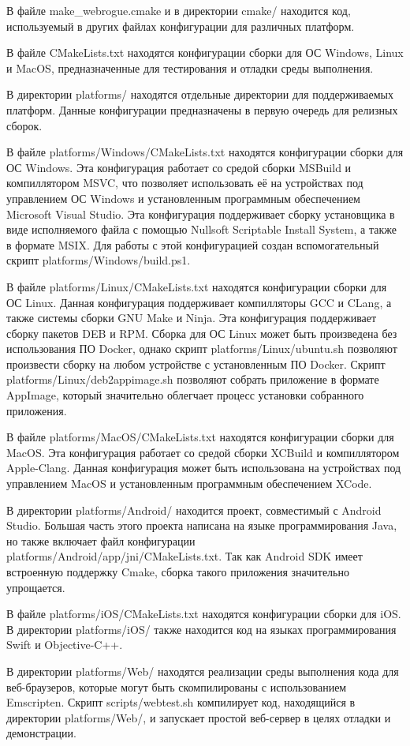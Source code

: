 В файле make\_webrogue.cmake и в директории cmake/ находится код, используемый в других файлах конфигурации для различных платформ.

В файле CMakeLists.txt находятся конфигурации сборки для ОС Windows, Linux и MacOS, предназначенные для тестирования и отладки среды выполнения.

В директории platforms/ находятся отдельные директории для поддерживаемых платформ. Данные конфигурации предназначены в первую очередь для релизных сборок.

В файле platforms/Windows/CMakeLists.txt находятся конфигурации сборки для ОС Windows. 
Эта конфигурация работает со средой сборки MSBuild и компиллятором MSVC, что позволяет использовать её на устройствах под управлением ОС Windows и установленным программным обеспечением Microsoft Visual Studio.
Эта конфигурация поддерживает сборку установщика в виде исполняемого файла с помощью Nullsoft Scriptable Install System, а также в формате MSIX.
Для работы с этой конфигурацией создан вспомогательный скрипт platforms/Windows/build.ps1.

В файле platforms/Linux/CMakeLists.txt находятся конфигурации сборки для ОС Linux. 
Данная конфигурация поддерживает компилляторы GCC и CLang, а также системы сборки GNU Make и Ninja.
Эта конфигурация поддерживает сборку пакетов DEB и RPM.
Сборка для ОС Linux может быть произведена без использования ПО Docker, однако скрипт platforms/Linux/ubuntu.sh позволяют произвести сборку на любом устройстве с установленным ПО Docker.
Скрипт platforms/Linux/deb2appimage.sh позволяют собрать приложение в формате AppImage, который значительно облегчает процесс установки собранного приложения.

В файле platforms/MacOS/CMakeLists.txt находятся конфигурации сборки для MacOS. 
Эта конфигурация работает со средой сборки XCBuild и компиллятором Apple-Clang.
Данная конфигурация может быть использована на устройствах под управлением MacOS и установленным программным обеспечением XCode.

В директории platforms/Android/ находится проект, совместимый с Android Studio.
Большая часть этого проекта написана на языке программирования Java, но также включает файл конфигурации platforms/Android/app/jni/CMakeLists.txt.
Так как Android SDK имеет встроенную поддержку Cmake, сборка такого приложения значительно упрощается.

В файле platforms/iOS/CMakeLists.txt находятся конфигурации сборки для iOS. 
В директории platforms/iOS/ также находится код на языках программирования Swift и Objective-C++.

В директории platforms/Web/ находятся реализации среды выполнения кода для веб-браузеров, которые могут быть скомпилированы с использованием Emscripten.
Скрипт scripts/webtest.sh компилирует код, находящийся в директории platforms/Web/, и запускает простой веб-сервер в целях отладки и демонстрации.
